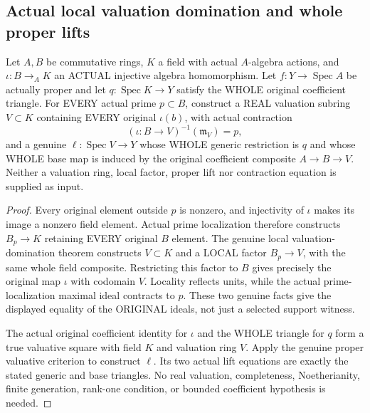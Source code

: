 \subsection{Actual local valuation domination and whole proper lifts}

\begin{lemma}
\label{scheme:actual-proper-local-valuation-lift}
\leanok
Let $A,B$ be commutative rings, $K$ a field with actual $A$-algebra actions,
and $\iota:B\to_A K$ an ACTUAL injective algebra homomorphism.  Let
$f:Y\to\operatorname{Spec}A$ be actually proper and let
$q:\operatorname{Spec}K\to Y$ satisfy the WHOLE original coefficient triangle.
For EVERY actual prime $p\subset B$, construct a REAL valuation subring
$V\subset K$ containing EVERY original $\iota(b)$, with actual contraction
\[
 (\iota:B\to V)^{-1}(\mathfrak m_V)=p,
\]
and a genuine $\ell:\operatorname{Spec}V\to Y$ whose WHOLE generic restriction
is $q$ and whose WHOLE base map is induced by the original coefficient
composite $A\to B\to V$.  Neither a valuation ring, local factor, proper lift
nor contraction equation is supplied as input.
\end{lemma}
\begin{proof}
Every original element outside $p$ is nonzero, and injectivity of $\iota$
makes its image a nonzero field element.  Actual prime localization therefore
constructs $B_p\to K$ retaining EVERY original $B$ element.  The genuine
local valuation-domination theorem constructs $V\subset K$ and a LOCAL
factor $B_p\to V$, with the same whole field composite.  Restricting this
factor to $B$ gives precisely the original map $\iota$ with codomain $V$.
Locality reflects units, while the actual prime-localization maximal ideal
contracts to $p$.  These two genuine facts give the displayed equality of
the ORIGINAL ideals, not just a selected support witness.

The actual original coefficient identity for $\iota$ and the WHOLE triangle
for $q$ form a true valuative square with field $K$ and valuation ring $V$.
Apply the genuine proper valuative criterion to construct $\ell$.  Its two
actual lift equations are exactly the stated generic and base triangles.
No real valuation, completeness, Noetherianity, finite generation, rank-one
condition, or bounded coefficient hypothesis is needed.
\end{proof}
